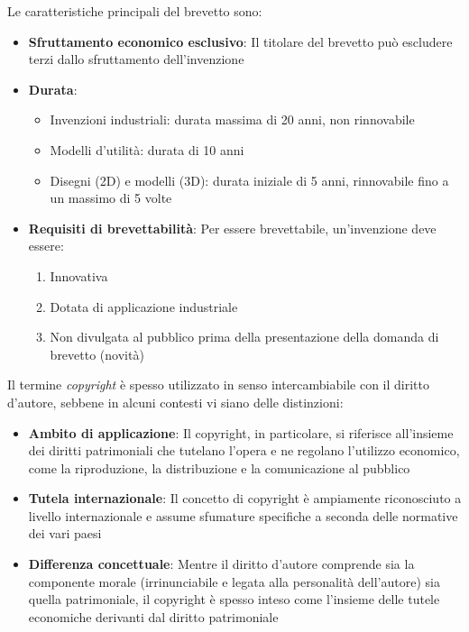 \documentclass[8pt,oneside,a4paper]{article}
\begin{document}
	Le caratteristiche principali del brevetto sono:
	\begin{itemize}
		\item \textbf{Sfruttamento economico esclusivo}: Il titolare del brevetto può escludere terzi dallo sfruttamento dell'invenzione
		\item \textbf{Durata}:
		\begin{itemize}
			\item Invenzioni industriali: durata massima di 20 anni, non rinnovabile
			\item Modelli d'utilità: durata di 10 anni
			\item Disegni (2D) e modelli (3D): durata iniziale di 5 anni, rinnovabile fino a un massimo di 5 volte
		\end{itemize}
		\item \textbf{Requisiti di brevettabilità}:  
		Per essere brevettabile, un'invenzione deve essere:
		\begin{enumerate}
			\item Innovativa
			\item Dotata di applicazione industriale
			\item Non divulgata al pubblico prima della presentazione della domanda di brevetto (novità)
		\end{enumerate}
	\end{itemize}
	Il termine \textit{copyright} è spesso utilizzato in senso intercambiabile con il diritto d'autore, sebbene in alcuni contesti vi siano delle distinzioni:
	\begin{itemize}
		\item \textbf{Ambito di applicazione}:  
		Il copyright, in particolare, si riferisce all'insieme dei diritti patrimoniali che tutelano l'opera e ne regolano l'utilizzo economico, come la riproduzione, la distribuzione e la comunicazione al pubblico
		\item \textbf{Tutela internazionale}:  
		Il concetto di copyright è ampiamente riconosciuto a livello internazionale e assume sfumature specifiche a seconda delle normative dei vari paesi
		\item \textbf{Differenza concettuale}:  
		Mentre il diritto d'autore comprende sia la componente morale (irrinunciabile e legata alla personalità dell'autore) sia quella patrimoniale, il copyright è spesso inteso come l'insieme delle tutele economiche derivanti dal diritto patrimoniale
	\end{itemize}
\end{document}
